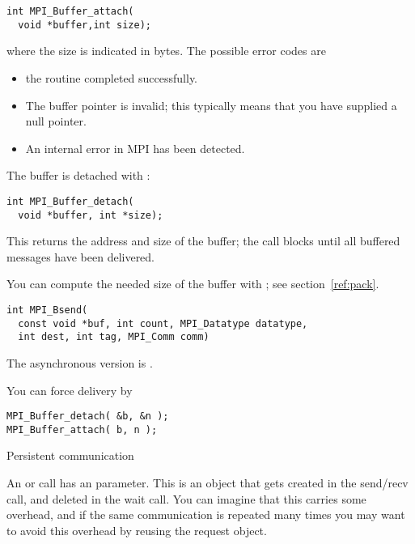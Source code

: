 \begin{verbatim}
int MPI_Buffer_attach(
  void *buffer,int size);
\end{verbatim}
where the size is indicated in bytes.
The possible error codes are
\begin{itemize}
\item {} the routine completed successfully.
\item {} The buffer pointer is invalid;
  this typically means that you have supplied a null pointer.
\item {} An internal error in MPI has been detected.
\end{itemize}

The buffer is detached with :
\begin{verbatim}
int MPI_Buffer_detach(
  void *buffer, int *size);
\end{verbatim}
This returns the address and size of the buffer; the call blocks
until all buffered messages have been delivered.

You can compute the needed size of the buffer with ;
  see section~\ref{ref:pack}.

\begin{verbatim}
int MPI_Bsend(
  const void *buf, int count, MPI_Datatype datatype, 
  int dest, int tag, MPI_Comm comm)
\end{verbatim}
The asynchronous version is .

You can force delivery by
\begin{verbatim}
MPI_Buffer_detach( &b, &n );
MPI_Buffer_attach( b, n );
\end{verbatim}

 {Persistent communication}

An  or  call has an  parameter. This
is an object that gets created in the send/recv call, and deleted in
the wait call. You can imagine that this carries some overhead, and if
the same communication is repeated many times you may want to avoid
this overhead by reusing the request object.

